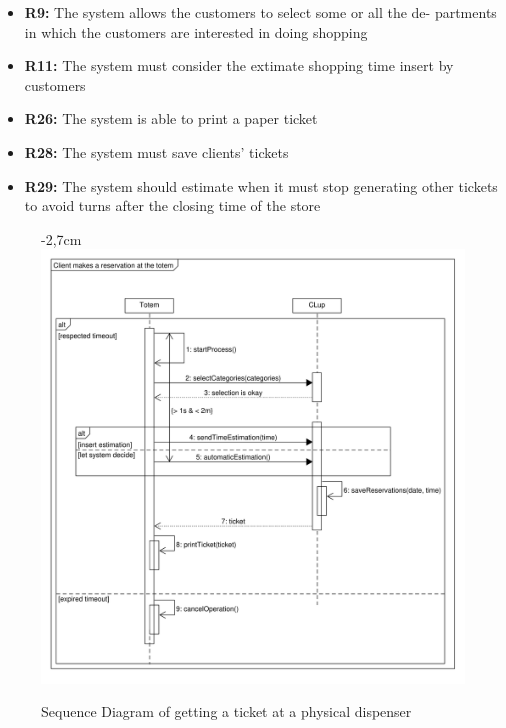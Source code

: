 \documentclass{article}
\begin{document}
\begin{center}
\begin{adjustwidth}{-2.8cm}{}
\begin{tabular}[h!]{|m{7.5em}|m{36em}|}
						\end{tabular}
					

				
					\end{adjustwidth}
				
														\begin{itemize}
					\bigskip
					\bigskip
					\bigskip
					\bigskip
					{\bfseries Required functional requirements: }
					
					
					\item {\bfseries R9: } The system allows the customers to select some or all the de-
					partments in which the customers are interested in doing shopping
					\item {\bfseries R11: } The system must consider the extimate shopping time insert
					by customers
					\item {\bfseries R26: } The system is able to print a paper ticket
					
					\item {\bfseries R28: } The system must save clients' tickets
					\item {\bfseries R29: } The system should estimate when it must stop generating other tickets to avoid turns after the closing time of the store
					
					
					
					
				\end{itemize}
								\begin{figure}[!htb]
						\begin{adjustwidth} {-2,7cm}{}
							\centering
							\includegraphics[scale=0.56]{SD/11_getTicketAtTotem.pdf}\\
							\caption{Sequence Diagram of getting a ticket at a physical dispenser}
						\end{adjustwidth}
					\end{figure}
				\end{center}
			\newpage
\end{document}

